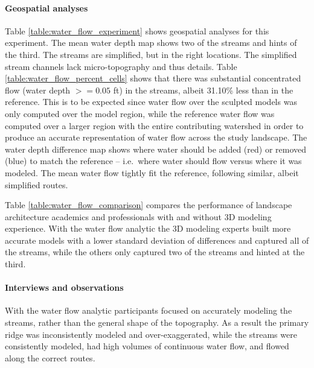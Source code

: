 \documentclass[prodmode,acmtochi]{acmsmall} %
\begin{document}
\paragraph{Geospatial analyses}
Table \ref{table:water_flow_experiment} 
shows geospatial analyses for this experiment.
The mean water depth map shows two of the streams 
and hints of the third.
The streams are simplified, but in the right locations. 
The simplified stream channels lack micro-topography
and thus details. 
Table \ref{table:water_flow_percent_cells} shows that 
there was substantial concentrated flow (water depth $>=0.05$ ft) 
in the streams, albeit 31.10\% less than in the reference.
This is to be expected since 
water flow over the sculpted models 
was only computed over the model region, while 
the reference water flow 
was computed over a larger region 
with the entire contributing watershed 
in order to produce an accurate representation 
of water flow across the study landscape. 
The water depth difference map shows
where water should be added (red) or removed (blue) 
to match the reference
-- i.e.~where water should flow versus where it was modeled. 
The mean water flow tightly fit the reference, 
following similar, albeit simplified routes.

Table \ref{table:water_flow_comparison} compares the performance of 
landscape architecture academics and professionals 
with and without 3D modeling experience. 
With the water flow analytic
the 3D modeling experts built more accurate models
with a lower standard deviation of differences 
and captured all of the streams,
while the others only captured two of the streams
and hinted at the third.

\paragraph{Interviews and observations}
With the water flow analytic
participants focused on accurately modeling the streams, 
rather than the general shape of the topography. 
As a result the primary ridge was 
inconsistently modeled and over-exaggerated,
while the streams were consistently modeled,
had high volumes of continuous water flow, 
and flowed along the correct routes.
\end{document}
